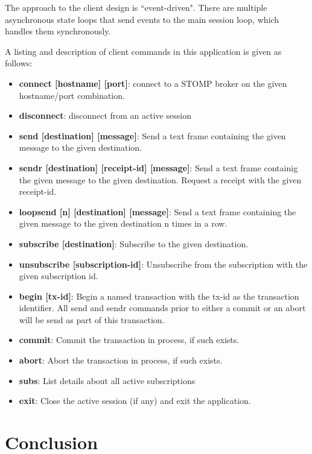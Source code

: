 \documentclass[conference, letterpaper]{IEEEtran}
\begin{document}
The approach to the client design is ``event-driven". There are multiple asynchronous state loops that send events to the main session loop, which handles them synchronously.

A listing and description of client commands in this application is given as follows:

\begin{itemize}
    \item \textbf{connect [hostname] [port]}: connect to a STOMP broker on the given hostname/port combination.
    \item \textbf{disconnect}: disconnect from an active session
    \item \textbf{send [destination] [message]}: Send a text frame containing the given message to the given destination.
    \item \textbf{sendr [destination] [receipt-id] [message]}: Send a text frame containig the given message to the given destination. Request a receipt with the given receipt-id.
    \item \textbf{loopsend [n] [destination] [message]}: Send a text frame containing the given message to the given destination n times in a row.
    \item \textbf{subscribe [destination]}: Subscribe to the given destination.
    \item \textbf{unsubscribe [subscription-id]}: Unsubscribe from the subscription with the given subscription id.
    \item \textbf{begin [tx-id]}: Begin a named transaction with the tx-id as the transaction identifier. All send and sendr commands prior to either a commit or an abort will be send as part of this transaction.
    \item \textbf{commit}: Commit the transaction in process, if such exists.
    \item \textbf{abort}: Abort the transaction in process, if such exists.
    \item \textbf{subs}: List details about all active subscriptions
    \item \textbf{exit}: Close the active session (if any) and exit the application.
\end{itemize}

\section{Conclusion}
\end{document}
